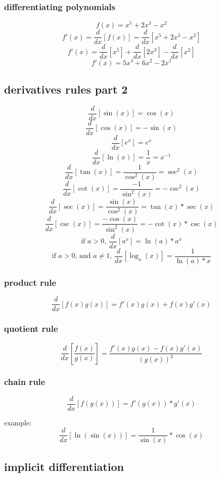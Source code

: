 \documentclass[11pt,a4paper]{article}
\begin{document}
\subsubsection{differentiating polynomials}

$$f(x) = x^5+2x^3-x^2$$
$$f'(x) = \dfrac{d}{dx}\left[f(x)\right] = \dfrac{d}{dx}\left[x^5+2x^3-x^2\right]$$
$$f'(x) = \dfrac{d}{dx}\left[x^5\right] + \dfrac{d}{dx}\left[2x^3\right] - \dfrac{d}{dx}\left[x^2\right]$$
$$f'(x) = 5x^4+6x^2-2x^1$$


\subsection{derivatives rules part 2}
$$\dfrac{d}{dx}\left[\sin(x)\right] = \cos(x)$$
$$\dfrac{d}{dx}\left[\cos(x)\right] = -\sin(x)$$
$$\dfrac{d}{dx}\left[e^x\right] = e^x$$
$$\dfrac{d}{dx}\left[\ln(x)\right] = \frac{1}{x} = x^{-1}$$
$$\dfrac{d}{dx}\left[\tan(x)\right] = \frac{1}{\cos^2(x)} = \sec^2(x)$$
$$\dfrac{d}{dx}\left[\cot(x)\right] = \frac{-1}{\sin^2(x)} = -\csc^2(x)$$
$$\dfrac{d}{dx}\left[\sec(x)\right] = \frac{\sin(x)}{\cos^2(x)} = \tan(x)*\sec(x)$$
$$\dfrac{d}{dx}\left[\csc(x)\right] = \frac{-\cos(x)}{\sin^2(x)} = -\cot(x)*\csc(x)$$
$$\text{if }a>0\text{, }\dfrac{d}{dx}\left[a^x\right] = \ln(a)*a^x$$
$$\text{if }a>0\text{, and }a\neq1\text{, }\dfrac{d}{dx}\left[\log_a(x)\right] = \frac{1}{\ln(a)*x}$$

\subsubsection{product rule}
$$\dfrac{d}{dx}\left[f(x)g(x)\right] = f'(x)g(x)+f(x)g'(x)$$

\subsubsection{quotient rule}
$$\dfrac{d}{dx}\left[\frac{f(x)}{g(x)}\right] = \frac{f'(x)g(x)-f(x)g'(x)}{(g(x))^2}$$

\subsubsection{chain rule}
$$\dfrac{d}{dx}\left[f(g(x))\right] = f'(g(x))*g'(x)$$

example:
$$\dfrac{d}{dx}\left[\ln(\sin(x))\right] = \frac{1}{\sin(x)}*\cos(x)$$

\subsection{implicit differentiation}
\end{document}
